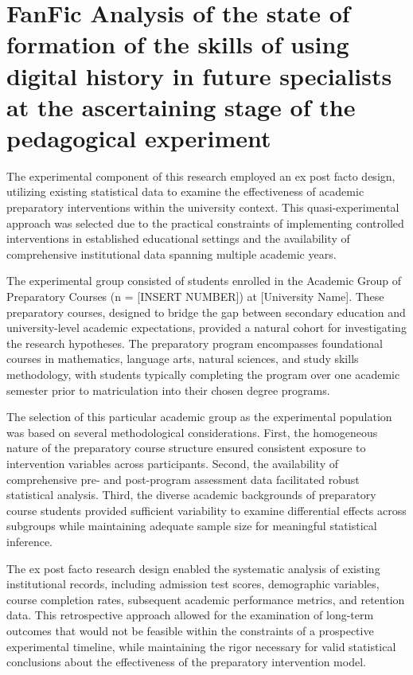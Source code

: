 



\section{FanFic Analysis of the state of formation of the skills of using digital history in future specialists at the ascertaining stage of the pedagogical experiment}

The experimental component of this research employed an ex post facto design, utilizing existing statistical data to examine the effectiveness of academic preparatory interventions within the university context. This quasi-experimental approach was selected due to the practical constraints of implementing controlled interventions in established educational settings and the availability of comprehensive institutional data spanning multiple academic years.

The experimental group consisted of students enrolled in the Academic Group of Preparatory Courses (n = [INSERT NUMBER]) at [University Name]. These preparatory courses, designed to bridge the gap between secondary education and university-level academic expectations, provided a natural cohort for investigating the research hypotheses. The preparatory program encompasses foundational courses in mathematics, language arts, natural sciences, and study skills methodology, with students typically completing the program over one academic semester prior to matriculation into their chosen degree programs.

The selection of this particular academic group as the experimental population was based on several methodological considerations. First, the homogeneous nature of the preparatory course structure ensured consistent exposure to intervention variables across participants. Second, the availability of comprehensive pre- and post-program assessment data facilitated robust statistical analysis. Third, the diverse academic backgrounds of preparatory course students provided sufficient variability to examine differential effects across subgroups while maintaining adequate sample size for meaningful statistical inference.

The ex post facto research design enabled the systematic analysis of existing institutional records, including admission test scores, demographic variables, course completion rates, subsequent academic performance metrics, and retention data. This retrospective approach allowed for the examination of long-term outcomes that would not be feasible within the constraints of a prospective experimental timeline, while maintaining the rigor necessary for valid statistical conclusions about the effectiveness of the preparatory intervention model.


